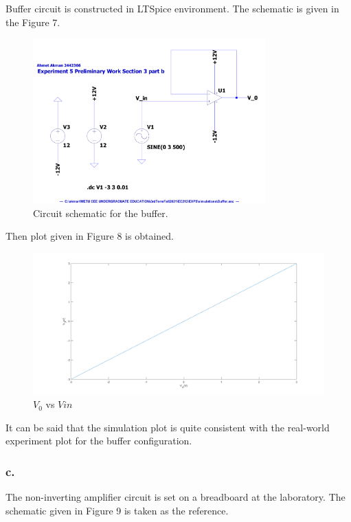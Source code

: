 \documentclass[letterpaper,12pt]{article}
\begin{document}
Buffer circuit is constructed in LTSpice environment. The schematic is given in the Figure 7.
\begin{figure}[H]
	\centering
   \includegraphics[width=0.8\textwidth]{Buffer_SCH.pdf}
   \caption{Circuit schematic for the buffer.}
\end{figure} 
Then plot given in Figure 8 is obtained.

\begin{figure}[H]
	\centering
   \includegraphics[width=1\textwidth]{3b_vs_vin.png}
   \caption{\(V_0\) vs \(V{in}\)}
\end{figure}
It can be said that the simulation plot is quite consistent with the real-world experiment plot for the buffer configuration.
\subsubsection{c.}
The non-inverting amplifier circuit is set on a breadboard at the laboratory. The schematic given in Figure 9 is taken as the reference.  
\end{document}
